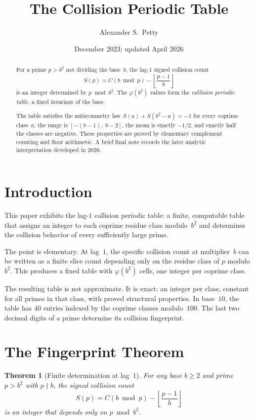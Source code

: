 \documentclass[12pt]{amsart}
\title{The Collision Periodic Table}
\author{Alexander S.\ Petty}
\date{December 2023; updated April 2026}
\newtheorem{theorem}{Theorem}
\theoremstyle{definition}
\theoremstyle{remark}
\begin{document}
\begin{abstract}
For a prime $p > b^2$ not dividing the base~$b$, the
lag-$1$ signed collision count
\[
S(p) = C(b \bmod p) - \left\lfloor \frac{p-1}{b}\right\rfloor
\]
is an integer determined by $p \bmod b^2$. The
$\varphi(b^2)$ values form the \emph{collision periodic
table}, a fixed invariant of the base.

The table satisfies the antisymmetry law
$S(a) + S(b^2 - a) = -1$ for every coprime class~$a$,
the range is $[-(b{-}1),\; b{-}2]$, the mean is exactly
$-1/2$, and exactly half the classes are negative. These
properties are proved by elementary complement counting
and floor arithmetic. A brief final note records the later
analytic interpretation developed in 2026.
\end{abstract}
\maketitle

\section{Introduction}

This paper exhibits the lag-$1$ collision periodic table:
a finite, computable table that assigns an integer to each
coprime residue class modulo~$b^2$ and determines the
collision behavior of every sufficiently large prime.

The point is elementary. At lag~$1$, the specific
collision count at multiplier~$b$ can be written as a
finite slice count depending only on the residue class of
$p$ modulo~$b^2$. This produces a fixed table with
$\varphi(b^2)$ cells, one integer per coprime class.

The resulting table is not approximate. It is exact: an
integer per class, constant for all primes in that class,
with proved structural properties. In base~$10$, the table
has $40$ entries indexed by the coprime classes
modulo~$100$. The last two decimal digits of a prime
determine its collision fingerprint.

\section{The Fingerprint Theorem}

\begin{theorem}[Finite determination at lag~$1$]
\label{thm:fingerprint}
For any base $b \ge 2$ and prime $p > b^2$ with
$p \nmid b$, the signed collision count
\[
S(p) = C(b \bmod p) -
\left\lfloor \frac{p-1}{b} \right\rfloor
\]
is an integer that depends only on $p \bmod b^2$.
\end{theorem}
\end{document}
